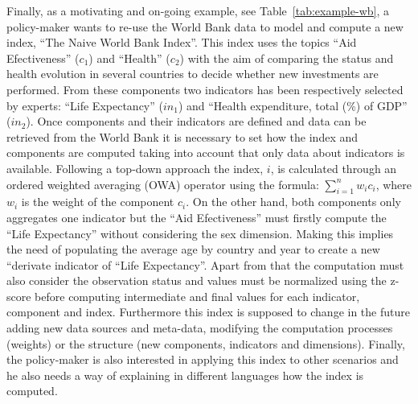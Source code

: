 Finally, as a motivating and on-going example, see Table~\ref{tab:example-wb}, a policy-maker wants to re-use the World Bank data to model and compute a new index, ``The Naive World Bank Index''. This 
index uses the topics ``Aid Efectiveness'' ($c_1$) and ``Health'' ($c_2$) with the aim of comparing the status and health evolution in several countries to decide whether new 
investments are performed. From these components two indicators has been respectively selected by experts: ``Life Expectancy'' ($in_1$) and ``Health expenditure, total (\%) of GDP'' ($in_2$). 
Once components and their indicators are defined and data can be retrieved from the World Bank it is necessary to set how the index and components are computed 
taking into account that only data about indicators is available. Following a top-down approach the index, $i$, is calculated through an ordered weighted averaging (OWA) operator using the 
formula: $\sum_{i=1}^n  w_i c_i$, where $w_i$ is the weight of the component $c_i$. On the other hand, both components only aggregates one indicator but the ``Aid Efectiveness'' 
must firstly compute the ``Life Expectancy'' without considering the sex dimension. Making this implies the need of populating the average age by country and year to create 
a new ``derivate indicator of ``Life Expectancy''. Apart from that the computation must also consider the observation status and values must be normalized using the 
z-score before computing intermediate and final values for each indicator, component and index. Furthermore this index is supposed to change in the future 
adding new data sources and meta-data, modifying the computation processes (weights) or the structure (new components, indicators and dimensions). Finally, the policy-maker 
is also interested in applying this index to other scenarios and he also needs a way of explaining in different languages how the index is computed. 


